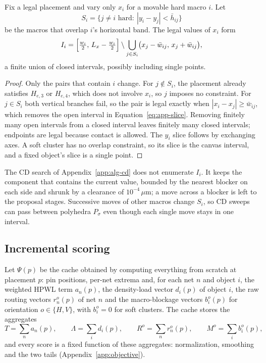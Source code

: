 \begin{appremark}\label{rem:slice}
Fix a legal placement and vary only $x_i$ for a movable hard macro $i$. Let
\begin{equation*}
 S_i=\bigl\{j\ne i\text{ hard}:\ |y_i-y_j|<\bar h_{ij}\bigr\}
\end{equation*}
be the macros that overlap $i$'s horizontal band. The legal values of $x_i$ form
\begin{equation}
 I_i=\Bigl[\tfrac{w_i}{2},\,L_x-\tfrac{w_i}{2}\Bigr]\setminus
     \bigcup_{j\in S_i}\bigl(x_j-\bar w_{ij},\,x_j+\bar w_{ij}\bigr),
 \label{eq:app-slice}
\end{equation}
a finite union of closed intervals, possibly including single points.
\end{appremark}
\begin{proof}
Only the pairs that contain $i$ change. For $j\notin S_i$, the placement already
satisfies $H_{e,3}$ or $H_{e,4}$, which does not involve $x_i$, so $j$ imposes no
constraint. For $j\in S_i$ both vertical branches fail, so the pair is legal exactly
when $|x_i-x_j|\ge\bar w_{ij}$, which removes the open interval in
Equation~\eqref{eq:app-slice}. Removing finitely many open intervals from a closed
interval leaves finitely many closed intervals; endpoints are legal because contact
is allowed. The $y_i$ slice follows by exchanging axes. A soft cluster has no
overlap constraint, so its slice is the canvas interval, and a fixed object's slice
is a single point.
\end{proof}
The CD search of Appendix~\ref{app:alg-cd} does not enumerate $I_i$. It keeps the
component that contains the current value, bounded by the nearest blocker on each
side and shrunk by a clearance of $10^{-4}\,\mu$m; a move across a blocker is left to
the proposal stages. Successive moves of other macros change $S_i$, so CD sweeps can
pass between polyhedra $P_\sigma$ even though each single move stays in one interval.

\subsection{Incremental scoring}

Let $\Psi(p)$ be the cache obtained by computing everything from scratch at
placement $p$: pin positions, per-net extrema and, for each net $n$ and object $i$,
the weighted HPWL term $a_n(p)$, the density-load vector $d_i(p)$ of object $i$,
the raw routing vectors $r_n^o(p)$ of net $n$ and the macro-blockage vectors
$b_i^o(p)$ for orientation $o\in\{H,V\}$, with $b_i^o=0$ for soft clusters. The cache
stores the aggregates
\begin{equation}
 T=\sum_na_n(p),\qquad \Lambda=\sum_id_i(p),\qquad R^o=\sum_nr_n^o(p),\qquad M^o=\sum_ib_i^o(p),
 \label{eq:app-cache}
\end{equation}
and every score is a fixed function of these aggregates: normalization, smoothing and
the two tails (Appendix~\ref{app:objective}).

